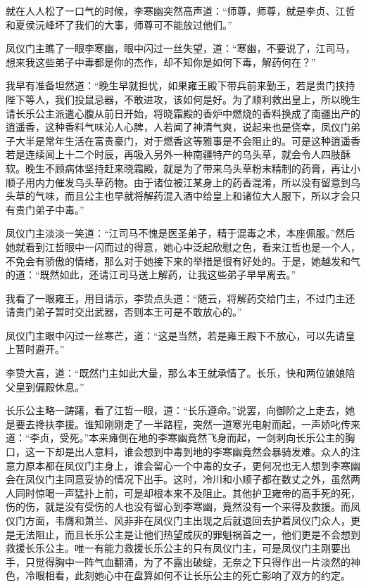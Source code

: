就在人人松了一口气的时候，李寒幽突然高声道：“师尊，师尊，就是李贞、江哲和夏侯沅峰坏了我们的大事，师尊可不能放过他们。”

凤仪门主瞧了一眼李寒幽，眼中闪过一丝失望，道：“寒幽，不要说了，江司马，想来我这些弟子中毒都是你的杰作，却不知你是如何下毒，解药何在？”

我早有准备坦然道：“晚生早就担忧，如果雍王殿下带兵前来勤王，若是贵门挟持陛下等人，我们投鼠忌器，不敢进攻，该如何是好。为了顺利救出皇上，所以晚生请长乐公主派遣心腹从前日开始，将晓霜殿的香炉中燃烧的香料换成了南疆出产的逍遥香，这种香料气味沁人心脾，人若闻了神清气爽，说起来也是侥幸，凤仪门弟子大半是常年生活在富贵豪门，对于燃香这等雅事是不会阻止的。可是这种逍遥香若是连续闻上十二个时辰，再吸入另外一种南疆特产的乌头草，就会令人四肢酥软。晚生不顾病体坚持赶来晓霜殿，就是为了带来乌头草粉末精制的药膏，再让小顺子用内力催发乌头草药物。由于诸位被江某身上的药香混淆，所以没有留意到乌头草的气味，而且公主也早就将解药混入酒中给皇上和诸位大人服下，所以才会只有贵门弟子中毒。”

凤仪门主淡淡一笑道：“江司马不愧是医圣弟子，精于混毒之术，本座佩服。”然后她就看到江哲眼中一闪而过的得意，她心中泛起欣慰之色，看来江哲也是一个人，不免会有骄傲的情绪，那么对于她接下来的举措是很有好处的。于是，她越发和气的道：“既然如此，还请江司马送上解药，让我这些弟子早早离去。”

我看了一眼雍王，用目请示，李贽点头道：“随云，将解药交给门主，不过门主还请贵门弟子暂时交出武器，否则本王可是不敢放心的。”

凤仪门主眼中闪过一丝寒芒，道：“这是当然，若是雍王殿下不放心，可以先请皇上暂时避开。”

李贽大喜，道：“既然门主如此大量，那么本王就承情了。长乐，快和两位娘娘陪父皇到偏殿休息。”

长乐公主略一踌躇，看了江哲一眼，道：“长乐遵命。”说罢，向御阶之上走去，她是要去搀扶李援。谁知刚刚走了一半路程，突然一道寒光电射而起，一声娇叱传来道：“李贞，受死。”本来瘫倒在地的李寒幽竟然飞身而起，一剑刺向长乐公主的胸口，这一下却是出人意料，谁会想到中毒到地的李寒幽竟然会暴骑发难。众人的注意力原本都在凤仪门主身上，谁会留心一个中毒的女子，更何况也无人想到李寒幽会在凤仪门主同意妥协的情况下出手。这时，冷川和小顺子都在数丈之外，虽然两人同时惊喝一声猛扑上前，可是却根本来不及阻止。其他护卫雍帝的高手死的死，伤的伤，就是没有受伤的人也没有留心到李寒幽，竟然没有一个来得及救援。而凤仪门方面，韦膺和萧兰、风非非在凤仪门主出现之后就退回去护着凤仪门众人，更是无法阻止，而且长乐公主是让他们热望成灰的罪魁祸首之一，他们更是不会想到救援长乐公主。唯一有能力救援长乐公主的只有凤仪门主，可是凤仪门主刚要出手，只觉得胸中一阵气血翻涌，为了不露出破绽，无奈之下只得作出一片淡然的神色，冷眼相看，此刻她心中在盘算如何不让长乐公主的死亡影响了双方的约定。

